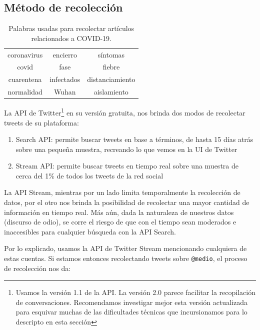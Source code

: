 \subsection{Método de recolección}

\begin{table}[t]
    \centering
    \begin{tabular}{ c|c|c }
        coronavirus  &  encierro          & síntomas \\
        covid        &  fase              & fiebre   \\
        cuarentena   &  infectados        & distanciamiento     \\
        normalidad   &  Wuhan             & aislamiento\\
    \end{tabular}
    \caption{Palabras usadas para recolectar artículos relacionados a COVID-19.\label{tab:article_words}}
\end{table}


La API de Twitter\footnote{Usamos la versión 1.1 de la API. La versión 2.0 parece facilitar la recopilación de conversaciones. Recomendamos investigar mejor esta versión actualizada para esquivar muchas de las dificultades técnicas que incursionamos para lo descripto en esta sección} en su versión gratuita, nos brinda dos modos de recolectar tweets de su plataforma:

\begin{enumerate}
    \item Search API: permite buscar tweets en base a términos, de hasta 15 días atrás sobre una pequeña muestra, recreando lo que vemos en la UI de Twitter
    \item Stream API: permite buscar tweets en tiempo real sobre una muestra de cerca del 1\% de todos los tweets de la red social
\end{enumerate}

La API Stream, mientras por un lado limita temporalmente la recolección de datos, por el otro nos brinda la posibilidad de recolectar una mayor cantidad de información en tiempo real. Más aún, dada la naturaleza de nuestros datos (discurso de odio), se corre el riesgo de que con el tiempo sean moderados e inaccesibles para cualquier búsqueda con la API Search. 


Por lo explicado, usamos la API de Twitter Stream mencionando cualquiera de estas cuentas. Si estamos entonces recolectando tweets sobre \verb|@medio|, el proceso de recolección nos da:

